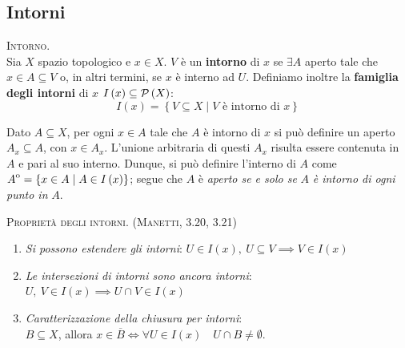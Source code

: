 \subsection{Intorni}
\begin{define}\textsc{Intorno.}\\
Sia $X$ spazio topologico e $x\in X$. $V$ è un \textbf{intorno} di $x$ se $\exists A$ aperto tale che $x\in A\subseteq V$ o, in altri termini, se $x$ è interno ad $U$.
Definiamo inoltre la \textbf{famiglia degli intorni} di $x$ $I\left(x\right)\subseteq\mathcal{P}\left(X\right)$:
\begin{equation}
I\left(x\right)=\left\{V\subseteq X\mid V\text{ è intorno di }x \right\}
\end{equation}
\vspace{-6mm}
\end{define}
\begin{observe}
	Dato $A\subseteq X$, per ogni $x\in A$ tale che $A$ è intorno di $x$ si può definire un aperto $A_x\subseteq A$, con $x\in A_x$. L'unione arbitraria di questi $A_x$ risulta essere contenuta in $A$ e pari al suo interno. Dunque, si può definire l'interno di $A$ come ${\kern0ptA}^{\mathrm{o}}=\left\{x\in A\mid A\in I\left(x\right)\right\}$; segue che $A$ è \textit{aperto se e solo se} $A$ \textit{è intorno di ogni punto in} $A$.
\end{observe}
\begin{lemming}\textsc{Proprietà degli intorni. (Manetti, 3.20, 3.21)}
\begin{enumerate}
\item \textit{Si possono estendere gli intorni}: $U\in I\left(x\right),\ U\subseteq V\implies V\in I\left(x\right)$
\item \textit{Le intersezioni di intorni sono ancora intorni}: $U,\ V\in I\left(x\right)\implies U\cap V\in I\left(x\right)$
\item \textit{Caratterizzazione della chiusura per intorni}:\\$B\subseteq X$, allora $x\in\overline{B}\iff\forall U\in I\left(x\right)\quad U\cap B\neq \emptyset$.
\end{enumerate}
\vspace{-3mm}
\end{lemming}
